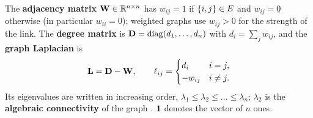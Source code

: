 \begin{definition}
\label{def:ch23-laplacian}
The \textbf{adjacency matrix} $\mathbf{W} \in \mathbb{R}^{n
\times n}$ has $w_{ij} = 1$ if $\left\{ i, j \right\} \in E$ and $w_{ij} = 0$ otherwise
(in particular $w_{ii} = 0$); weighted graphs use $w_{ij} > 0$ for the strength
of the link. The \textbf{degree matrix} is
$\mathbf{D} = \operatorname{diag}(d_1, \dots, d_n)$ with $d_i = \sum_j w_{ij}$, and the
\textbf{graph Laplacian} is
\begin{equation}
  \mathbf{L} = \mathbf{D} - \mathbf{W}, \qquad
  \ell_{ij} = \begin{cases} d_i & i = j,\\ -w_{ij} & i \ne j. \end{cases}
  \label{eq:ch23-laplacian}
\end{equation}
Its eigenvalues are written in increasing order,
$\lambda_1 \le \lambda_2 \le \dots \le \lambda_n$; $\lambda_2$ is the
\textbf{algebraic connectivity}
of the graph \cite{fiedler1973algebraic}. $\mathbf{1}$ denotes the vector of $n$
ones.
\end{definition}

